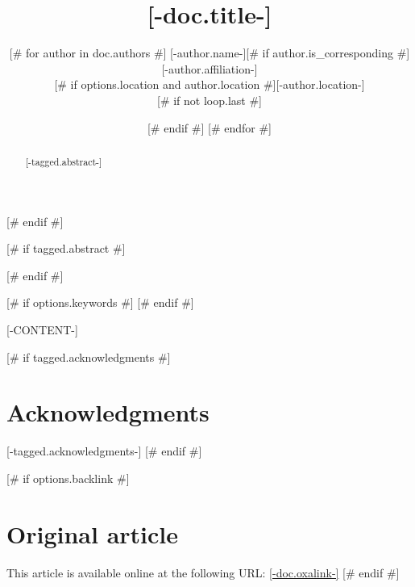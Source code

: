 \documentclass{article}
\title{[-doc.title-]}
\date{\displaydate{articleDate}}
[# else #]
\date{}
[# endif #]
\author{[# for author in doc.authors #]
[-author.name-][# if author.is_corresponding #]\footnotemark[1][# endif #]\\
[# if options.affiliation and author.affiliation #][-author.affiliation-]\\[# endif #]
[# if options.location and author.location #][-author.location-]\\[# endif #]
[# if not loop.last #]
\and
[# endif #]
[# endfor #]
}
\begin{document}
[# endif #]

[# if tagged.abstract #]
\begin{abstract}
[-tagged.abstract-]
\end{abstract}
[# endif #]

[# if options.keywords #]
[# endif #]

[-CONTENT-]

[# if tagged.acknowledgments #]
\section*{Acknowledgments}
[-tagged.acknowledgments-]
[# endif #]

[# if options.backlink #]
\section*{Original article}
\footnotesize
This article is available online at the following URL: \href{[-doc.oxalink-]}{[-doc.oxalink-]}
\normalsize
[# endif #]



\end{document}
